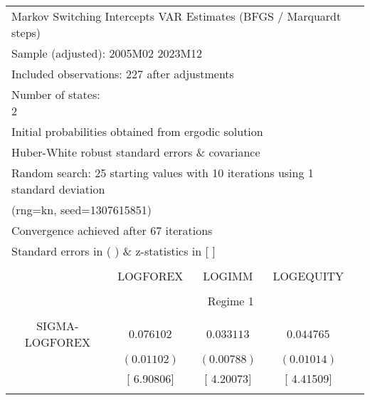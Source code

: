 \begin{tabular}{lrrrr}
\multicolumn{5}{l}{Markov Switching Intercepts VAR Estimates (BFGS / Marquardt steps)}\\
\multicolumn{3}{l}{Sample (adjusted): 2005M02 2023M12}&\multicolumn{1}{c}{}&\multicolumn{1}{c}{}\\
\multicolumn{3}{l}{Included observations: 227 after adjustments}&\multicolumn{1}{c}{}&\multicolumn{1}{c}{}\\
\multicolumn{1}{l}{Number of states: 2}&\multicolumn{1}{c}{}&\multicolumn{1}{c}{}&\multicolumn{1}{c}{}&\multicolumn{1}{c}{}\\
\multicolumn{4}{l}{Initial probabilities obtained from ergodic solution}&\multicolumn{1}{c}{}\\
\multicolumn{4}{l}{Huber-White robust standard errors \& covariance}&\multicolumn{1}{c}{}\\
\multicolumn{6}{l}{Random search: 25 starting values with 10 iterations using 1 standard deviation}\\
\multicolumn{2}{l}{(rng=kn, seed=1307615851)}&\multicolumn{1}{c}{}&\multicolumn{1}{c}{}&\multicolumn{1}{c}{}\\
\multicolumn{3}{l}{Convergence achieved after 67 iterations}&\multicolumn{1}{c}{}&\multicolumn{1}{c}{}\\
\multicolumn{3}{l}{Standard errors in ( ) \& z-statistics in [ ]}&\multicolumn{1}{c}{}&\multicolumn{1}{c}{}\\
[4.5pt] \hline \\ [-4.5pt]
\multicolumn{1}{c}{}&\multicolumn{1}{c}{LOGFOREX}&\multicolumn{1}{c}{LOGIMM}&\multicolumn{1}{c}{LOGEQUITY}&\multicolumn{1}{c}{}\\
[4.5pt] \hline \\ [-4.5pt]
\multicolumn{1}{c}{}&\multicolumn{3}{c}{Regime 1}&\multicolumn{1}{c}{}\\
[4.5pt] \hline \\ [-4.5pt]
\multicolumn{1}{c}{SIGMA-LOGFOREX}&\multicolumn{1}{c}{$0.076102$}&\multicolumn{1}{c}{$0.033113$}&\multicolumn{1}{c}{$0.044765$}&\multicolumn{1}{c}{}\\
\multicolumn{1}{c}{}&\multicolumn{1}{c}{$(0.01102)$}&\multicolumn{1}{c}{$(0.00788)$}&\multicolumn{1}{c}{$(0.01014)$}&\multicolumn{1}{c}{}\\
\multicolumn{1}{c}{}&\multicolumn{1}{c}{[ 6.90806]}&\multicolumn{1}{c}{[ 4.20073]}&\multicolumn{1}{c}{[ 4.41509]}&\multicolumn{1}{c}{}\\
\multicolumn{1}{c}{}&\multicolumn{1}{c}{}&\multicolumn{1}{c}{}&\multicolumn{1}{c}{}&\multicolumn{1}{c}{}\\

\end{tabular}
